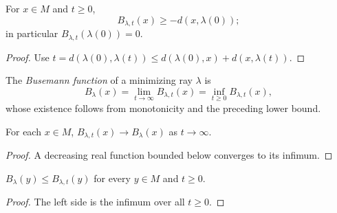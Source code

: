\begin{lemma}
\label{lem:busemann-approx-lower-bound}




For $x\in M$ and $t\ge0$,
$$B_{\lambda,t}(x)\ge-d(x,\lambda(0));$$
in particular $B_{\lambda,t}(\lambda(0))=0$.
\end{lemma}
\begin{proof}
\sketch

Use $t=d(\lambda(0),\lambda(t))\le d(\lambda(0),x)+d(x,\lambda(t))$.
\end{proof}

\begin{definition}
\label{def:busemann-function}






The \emph{Busemann function} of a minimizing ray $\lambda$ is
$$B_\lambda(x)=\lim_{t\to\infty}B_{\lambda,t}(x)
=\inf_{t\ge0}B_{\lambda,t}(x),$$
whose existence follows from monotonicity and the preceding lower bound.
\end{definition}

\begin{lemma}
\label{lem:busemann-limit}





For each $x\in M$, $B_{\lambda,t}(x)\to B_\lambda(x)$ as
$t\to\infty$.
\end{lemma}
\begin{proof}
\sketch

A decreasing real function bounded below converges to its infimum.
\end{proof}

\begin{lemma}
\label{lem:busemann-le-approx}





$B_\lambda(y)\le B_{\lambda,t}(y)$ for every $y\in M$ and $t\ge0$.
\end{lemma}
\begin{proof}
\sketch

The left side is the infimum over all $t\ge0$.
\end{proof}

